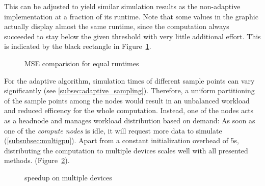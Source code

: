 This can be adjusted to yield similar simulation results as the non-adaptive
implementation at a fraction of its runtime. Note that some values in the
graphic actually display almost the same runtime, since the computation always
succeeded to stay below the given threshold with very little additional effort.
This is indicated by the black rectangle in Figure~\ref{plot:adaptive_runtime}.
\begin{figure}[H]
  \centerline{
    }
  \caption{MSE comparision for equal runtimes}
\label{plot:adaptive_runtime}
\end{figure}

For the adaptive algorithm, simulation times of different sample points can vary
significantly (see \cref{subsec:adaptive_sampling}). Therefore, a uniform
partitioning of the sample points among the nodes would result in an unbalanced
workload and reduced efficency for the whole computation. Instead, one of the
nodes acts as a headnode and manages workload distribution based on demand: As
soon as one of the \emph{compute nodes} is idle, it will request more data to
simulate (\cref{subsubsec:multigpu}).
Apart from a constant initialization overhead of 5s, distributing the computation to
multiple devices scales well with all presented methods. (Figure~\ref{plot:gpu_scaling}).
\begin{figure}[H]
  \centerline{
    }
  \caption{speedup on multiple devices}
\label{plot:gpu_scaling}
\end{figure}

